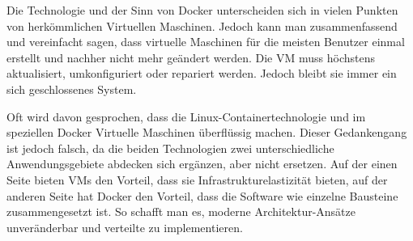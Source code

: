 
Die Technologie und der Sinn von Docker unterscheiden sich in vielen Punkten von herkömmlichen Virtuellen Maschinen. Jedoch kann man zusammenfassend und vereinfacht sagen, dass virtuelle Maschinen für die meisten Benutzer einmal erstellt und nachher nicht mehr geändert werden. Die VM muss höchstens aktualisiert, umkonfiguriert oder repariert werden. Jedoch bleibt sie immer ein sich geschlossenes System. \cite{DockerVsVm}

Oft wird davon gesprochen, dass die Linux-Containertechnologie und im speziellen Docker Virtuelle Maschinen überflüssig machen. Dieser Gedankengang ist jedoch falsch, da die beiden Technologien zwei unterschiedliche Anwendungsgebiete abdecken sich ergänzen, aber nicht ersetzen. Auf der einen Seite bieten VMs den Vorteil, dass sie Infrastrukturelastizität bieten, auf der anderen Seite hat Docker den Vorteil, dass die Software wie einzelne Bausteine zusammengesetzt ist. So schafft man es, moderne Architektur-Ansätze unveränderbar und verteilte zu implementieren. \cite{DockerVsVm}
